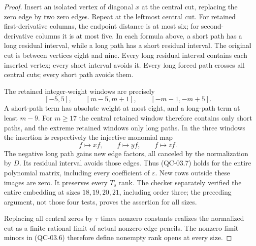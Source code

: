 \begin{proof}
Insert an isolated vertex of diagonal $x$ at the central cut,
replacing the zero edge by two zero edges. Repeat at the leftmost
central cut. For retained first-derivative columns, the endpoint
distance is at most six; for second-derivative columns it is at
most five. In each formula above, a short path has a long residual
interval, while a long path has a short residual interval.
The original cut is between vertices eight and nine. Every long
residual interval contains each inserted vertex; every short
interval avoids it. Every long forced path crosses all central
cuts; every short path avoids them.

The retained integer-weight windows are precisely
\[
 [-5,5],\qquad[m-5,m+1],\qquad[-m-1,-m+5].
\]
A short-path term has absolute weight at most eight, and a long-path
term at least $m-9$. For $m\geq17$ the central retained window
therefore contains only short paths, and the extreme retained
windows only long paths. In the three windows the insertion is
respectively the injective monomial map
\[
 f\longmapsto xf,\qquad f\longmapsto yf,\qquad f\longmapsto zf.
 \tag{QC-03.7}
\]
The negative long path gains new edge factors, all canceled by
the normalization by $D$. Its residual interval avoids those
edges. Thus (QC-03.7) holds for the entire polynomial matrix,
including every coefficient of $\varepsilon$. New rows outside
these images are zero. It preserves every $T_s$ rank.
The checker separately verified the entire embedding at sizes
$18,19,20,21$, including order three; the preceding argument, not
those four tests, proves the assertion for all sizes.

Replacing all central zeros by $\tau$ times nonzero constants
realizes the normalized cut as a finite rational limit of actual
nonzero-edge pencils. The nonzero limit minors in (QC-03.6)
therefore define nonempty rank opens at every size.


\end{proof}

